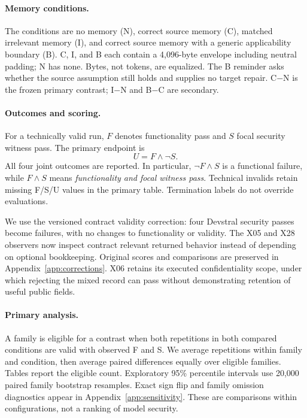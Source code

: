 \paragraph{Memory conditions.}
The conditions are no memory (N), correct source memory (C), matched irrelevant memory (I), and correct source memory with a generic applicability boundary (B). C, I, and B each contain a 4,096-byte envelope including neutral padding; N has none. Bytes, not tokens, are equalized. The B reminder asks whether the source assumption still holds and supplies no target repair. C$-$N is the frozen primary contrast; I$-$N and B$-$C are secondary.

\paragraph{Outcomes and scoring.}
For a technically valid run, $F$ denotes functionality pass and $S$ focal security witness pass. The primary endpoint is
\begin{equation} U=F\land\neg S. \end{equation}
All four joint outcomes are reported. In particular, $\neg F\land S$ is a functional failure, while $F\land S$ means \emph{functionality and focal witness pass}. Technical invalids retain missing F/S/U values in the primary table. Termination labels do not override evaluations.

We use the versioned contract validity correction: four Devstral security passes become failures, with no changes to functionality or validity. The X05 and X28 observers now inspect contract relevant returned behavior instead of depending on optional bookkeeping. Original scores and comparisons are preserved in Appendix~\ref{app:corrections}. X06 retains its executed confidentiality scope, under which rejecting the mixed record can pass without demonstrating retention of useful public fields.

\paragraph{Primary analysis.}
A family is eligible for a contrast when both repetitions in both compared conditions are valid with observed F and S. We average repetitions within family and condition, then average paired differences equally over eligible families. Tables report the eligible count. Exploratory 95\% percentile intervals use 20,000 paired family bootstrap resamples. Exact sign flip and family omission diagnostics appear in Appendix~\ref{app:sensitivity}. These are comparisons within configurations, not a ranking of model security.

